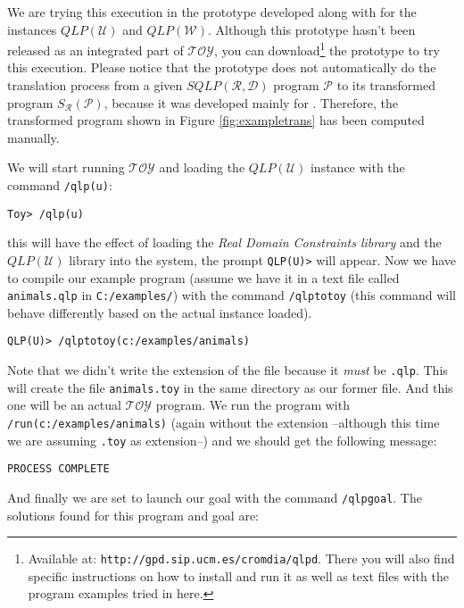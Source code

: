 \documentclass{sigplanconf}
\newcommand{\toy}{\mathcal{TOY}} \newcommand{\NAT}{\mathbb{N}} \newcommand{\REAL}{\mathbb{R}}
\newcommand{\qdom}{\mathcal{D}} \newcommand{\dqdom}{D \setminus \{\bot\}} \newcommand{\bqdom}{(D \setminus \{\bot\}) \uplus \{?\}}
\newcommand{\U}{\mathcal{U}}
\newcommand{\W}{\mathcal{W}}
\newcommand{\simrel}{\mathcal{R}}
\newcommand{\qlp}[1]{QLP({#1})} \newcommand{\slp}[2]{SLP({#1,#2})} \newcommand{\sqlp}[2]{SQLP({#1,#2})} \newcommand{\bqlp}[1]{BQLP({#1})} \newcommand{\clp}[1]{CLP({#1})}
\newcommand{\trans}[2]{S_{#1}(#2)}
\newcommand{\Prog}{\mathcal{P}} \newcommand{\UProg}{\mathcal{P_U}}
\theoremstyle{definition}
\theoremstyle{plain}
\begin{document}
We are trying this execution in the prototype developed along with \cite{RR08} for the instances $\qlp{\U}$ and $\qlp{\W}$. Although this prototype hasn't been released as an integrated part of $\toy$, you can download\footnote{Available at: \texttt{http://gpd.sip.ucm.es/cromdia/qlpd}. There you will also find specific instructions on how to install and run it as well as text files with the program examples tried in here.} the prototype to try this execution. Please notice that the prototype does not automatically do the translation process from a given $\sqlp{\simrel}{\qdom}$ program $\Prog$ to its transformed program $\trans{\simrel}{\Prog}$, because it was developed mainly for \cite{RR08}. Therefore, the transformed program shown in Figure \ref{fig:exampletrans} has been computed manually.

We will start running $\toy$ and loading the $\qlp{\U}$ instance with the command \texttt{/qlp(u)}:

\begin{verbatim}
Toy> /qlp(u)
\end{verbatim}

\noindent this will have the effect of loading the \emph{Real Domain Constraints library} and the $\qlp{\U}$ library into the system, the prompt \texttt{QLP(U)>} will appear. Now we have to compile our example program (assume we have it in a text file called \texttt{animals.qlp} in \texttt{C:/examples/}) with the command \texttt{/qlptotoy} (this command will behave differently based on the actual instance loaded).

\begin{verbatim}
QLP(U)> /qlptotoy(c:/examples/animals)
\end{verbatim}

Note that we didn't write the extension of the file because it \emph{must} be \texttt{.qlp}. This will create the file \texttt{animals.toy} in the same directory as our former file. And this one will be an actual $\toy$ program. We run the program with \texttt{/run(c:/examples/animals)} (again without the extension --although this time we are assuming \texttt{.toy} as extension--) and we should get the following message:

\begin{verbatim}
PROCESS COMPLETE
\end{verbatim}

And finally we are set to launch our goal with the command \texttt{/qlpgoal}. The solutions found for this program and goal are:
\end{document}
